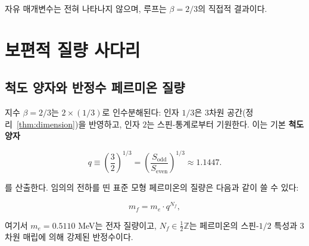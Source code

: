 \documentclass[12pt,a4paper]{article}
\theoremstyle{remark}
\begin{document}
	자유 매개변수는 전혀 나타나지 않으며, 루프는 \(\beta = 2/3\)의 직접적 결과이다.
	
	\section{보편적 질량 사다리}
	\label{sec:mass-ladder}
	
	\subsection{척도 양자와 반정수 페르미온 질량}
	
	지수 \(\beta = 2/3\)는 \(2 \times (1/3)\)로 인수분해된다: 인자 \(1/3\)은 3차원 공간(정리~\ref{thm:dimension})을 반영하고, 인자 \(2\)는 스핀-통계로부터 기원한다. 이는 기본 \textbf{척도 양자}
	
	\begin{equation}
		q \equiv \left(\frac{3}{2}\right)^{1/3}
		= \left(\frac{S_{\mathrm{odd}}}{S_{\mathrm{even}}}\right)^{1/3} \approx 1.1447.
	\end{equation}
	
	를 산출한다. 임의의 전하를 띤 표준 모형 페르미온의 질량은 다음과 같이 쓸 수 있다:
	
	\begin{equation}
		\boxed{m_f = m_e \cdot q^{N_f}},
		\label{eq:mass-quantization}
	\end{equation}
	
	여기서 \(m_e = 0.5110\) MeV는 전자 질량이고, \(N_f \in \frac{1}{2}\mathbb{Z}\)는 페르미온의 스핀-\(1/2\) 특성과 3차원 매립에 의해 강제된 반정수이다.
	
\end{document}
